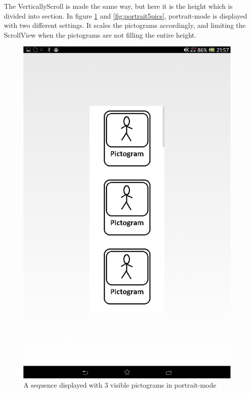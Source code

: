 The VerticallyScroll is made the same way, but here it is the height which is divided into section. In figure \ref{fig:portrait3pics} and \ref{fig:portrait5pics}, portrait-mode is displayed with two different settings. It scales the pictograms accordingly, and limiting the ScrollView when the pictograms are not filling the entire height.

\begin{figure}[h!]
\centering
\begin{minipage}{.45\textwidth}
\centering
\includegraphics[scale=0.1]{Pics/Sprint3/portrait3pics.png}
\caption{A sequence displayed with 3 visible pictograms in portrait-mode}
\label{fig:portrait3pics}
\end{minipage}\hfill

\end{figure}
